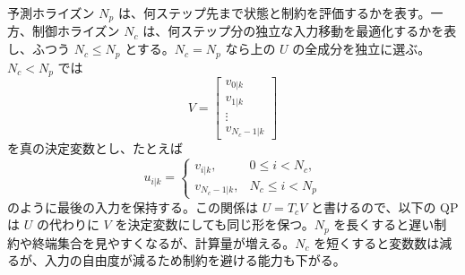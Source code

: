 予測ホライズン $N_p$ は、何ステップ先まで状態と制約を評価するかを表す。一方、制御ホライズン $N_c$ は、何ステップ分の独立な入力移動を最適化するかを表し、ふつう $N_c\le N_p$ とする。$N_c=N_p$ なら上の $U$ の全成分を独立に選ぶ。$N_c<N_p$ では
\begin{equation}
  V=
  \begin{bmatrix}
    v_{0|k}\\v_{1|k}\\\vdots\\v_{N_c-1|k}
  \end{bmatrix}
\end{equation}
を真の決定変数とし、たとえば
\begin{equation}
  u_{i|k}=
  \begin{cases}
    v_{i|k}, & 0\le i<N_c,\\
    v_{N_c-1|k}, & N_c\le i<N_p
  \end{cases}
\end{equation}
のように最後の入力を保持する。この関係は $U=T_cV$ と書けるので、以下の QP は $U$ の代わりに $V$ を決定変数にしても同じ形を保つ。$N_p$ を長くすると遅い制約や終端集合を見やすくなるが、計算量が増える。$N_c$ を短くすると変数数は減るが、入力の自由度が減るため制約を避ける能力も下がる。

